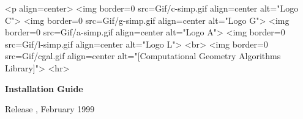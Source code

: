 
\pagestyle{empty}

\begin{titlepage}
  \mbox{} 
  \vspace{3cm}
  \ccTexHtml 
  {\centerline{
        }}
  {<p align=center>
    <img border=0 src=Gif/c-simp.gif align=center alt="Logo C">
    <img border=0 src=Gif/g-simp.gif align=center alt="Logo G">
    <img border=0 src=Gif/a-simp.gif align=center alt="Logo A">
    <img border=0 src=Gif/l-simp.gif align=center alt="Logo L">
    <br>
    <img border=0 src=Gif/cgal.gif align=center 
    alt="[Computational Geometry Algorithms Library]">
    <hr>}

  \vspace{2cm}
  \centerline{ {\huge{\bf Installation Guide}} }
  
  \vspace{2cm}
  \newcommand{\mydate}{February 1999}
  \ccTexHtml
  {\renewcommand{\mydate}{\ifcase\the\month \or January\or
      February\or March\or April\or May\or June\or July\or August\or
      September\or October\or November\or December\fi \the\year}}{}
  \centerline{ {\large Release \cgalrelease, \mydate} }
\end{titlepage}

%
\pagestyle{plain}
\setcounter{page}{0}
\cleardoublepage

